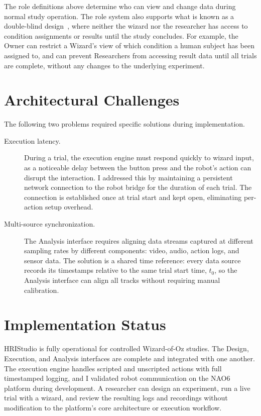 The role definitions above determine who can view and change data during normal study operation. The role system also supports what is known as a double-blind design~\cite{Bartneck2024}, where neither the wizard nor the researcher has access to condition assignments or results until the study concludes. For example, the Owner can restrict a Wizard's view of which condition a human subject has been assigned to, and can prevent Researchers from accessing result data until all trials are complete, without any changes to the underlying experiment.

\section{Architectural Challenges}

The following two problems required specific solutions during implementation.

\begin{description}
    \item[Execution latency.] During a trial, the execution engine must respond quickly to wizard input, as a noticeable delay between the button press and the robot's action can disrupt the interaction. I addressed this by maintaining a persistent network connection to the robot bridge for the duration of each trial. The connection is established once at trial start and kept open, eliminating per-action setup overhead.

    \item[Multi-source synchronization.] The Analysis interface requires aligning data streams captured at different sampling rates by different components: video, audio, action logs, and sensor data. The solution is a shared time reference: every data source records its timestamps relative to the same trial start time, $t_0$, so the Analysis interface can align all tracks without requiring manual calibration.
\end{description}

\section{Implementation Status}

HRIStudio is fully operational for controlled Wizard-of-Oz studies. The Design, Execution, and Analysis interfaces are complete and integrated with one another. The execution engine handles scripted and unscripted actions with full timestamped logging, and I validated robot communication on the NAO6 platform during development. A researcher can design an experiment, run a live trial with a wizard, and review the resulting logs and recordings without modification to the platform's core architecture or execution workflow.

